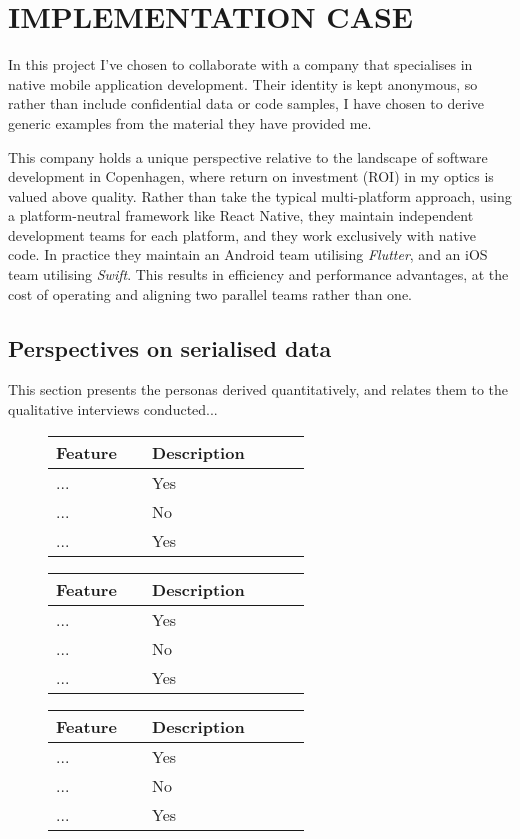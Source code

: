 \documentclass[../report.tex]{subfiles}
\begin{document}
\section{IMPLEMENTATION CASE} \label{sec:case}


In this project I've chosen to collaborate with a company that specialises in native mobile application development. Their identity is kept anonymous, so rather than include confidential data or code samples, I have chosen to derive generic examples from the material they have provided me.

This company holds a unique perspective relative to the landscape of software development in Copenhagen, where return on investment (ROI) in my optics is valued above quality. Rather than take the typical multi-platform approach, using a platform-neutral framework like React Native, they maintain independent development teams for each platform, and they work exclusively with native code. In practice they maintain an Android team utilising \textit{Flutter}, and an iOS team utilising \textit{Swift}. This results in efficiency and performance advantages, at the cost of operating and aligning two parallel teams rather than one.

\subsection{Perspectives on serialised data}

This section presents the personas derived quantitatively, and relates them to the qualitative interviews conducted... \\

\begin{figure}[H]
\def\arraystretch{1.5}
\centering
\begin{tabular}{|p{0.3\linewidth}|p{0.5\linewidth}|}
\hline
Feature & Description \\
\hline
... & Yes \\ 
... & No \\ 
... & Yes \\ 
\hline
\end{tabular}
\end{figure}

\begin{figure}[H]
\def\arraystretch{1.5}
\centering
\begin{tabular}{|p{0.3\linewidth}|p{0.5\linewidth}|}
\hline
Feature & Description \\
\hline
... & Yes \\ 
... & No \\ 
... & Yes \\ 
\hline
\end{tabular}
\end{figure}

\begin{figure}[H]
\def\arraystretch{1.5}
\centering
\begin{tabular}{|p{0.3\linewidth}|p{0.5\linewidth}|}
\hline
Feature & Description \\
\hline
... & Yes \\ 
... & No \\ 
... & Yes \\ 
\hline
\end{tabular}
\end{figure}
\end{document}
